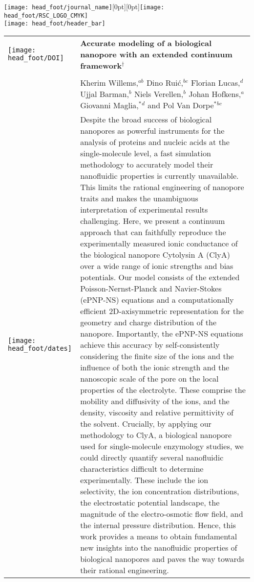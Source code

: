 \documentclass[twoside,twocolumn,9pt]{article}
\begin{document}
  \begin{@twocolumnfalse}
{\texttt{[image: head\_foot/journal\_name]}\hfill\raisebox{0pt}[0pt][0pt]{\texttt{[image: head\_foot/RSC\_LOGO\_CMYK]}}\\[1ex]
\texttt{[image: head\_foot/header\_bar]}}\par
\vspace{1em}
\sffamily
\begin{tabular}{m{4.5cm} p{13.5cm} }

\texttt{[image: head\_foot/DOI]} & \noindent\LARGE{\textbf{%
  Accurate modeling of a biological nanopore with an extended continuum framework$^\dag$
}} \\
\vspace{0.3cm} & \vspace{0.3cm} \\

 & \noindent\large{%
   Kherim Willems,\textit{$^{ab}$}
   Dino Rui\'c,\textit{$^{bc}$}
   Florian Lucas,\textit{$^{d}$}
   Ujjal Barman,\textit{$^{b}$}
   Niels Verellen,\textit{$^{b}$}
   Johan Hofkens,\textit{$^{a}$}
   Giovanni Maglia,$^{\ast}$\textit{$^{d}$} and
   Pol Van Dorpe$^{\ast}$\textit{$^{bc}$}} \\


\texttt{[image: head\_foot/dates]} & \noindent\normalsize{%
%
Despite the broad success of biological nanopores as powerful instruments for the analysis of proteins and
nucleic acids at the single-molecule level, a fast simulation methodology to accurately model their
nanofluidic properties is currently unavailable. This limits the rational engineering of nanopore traits and
makes the unambiguous interpretation of experimental results challenging. Here, we present a continuum
approach that can faithfully reproduce the experimentally measured ionic conductance of the biological
nanopore Cytolysin A (ClyA) over a wide range of ionic strengths and bias potentials. Our model consists of
the extended Poisson-Nernst-Planck and Navier-Stokes (ePNP-NS) equations and a computationally efficient
2D-axisymmetric representation for the geometry and charge distribution of the nanopore. Importantly, the
ePNP-NS equations achieve this accuracy by self-consistently considering the finite size of the ions and the
influence of both the ionic strength and the nanoscopic scale of the pore on the local properties of the
electrolyte. These comprise the mobility and diffusivity of the ions, and the density, viscosity and relative
permittivity of the solvent. Crucially, by applying our methodology to ClyA, a biological nanopore used for
single-molecule enzymology studies, we could directly quantify several nanofluidic characteristics difficult
to determine experimentally. These include the ion selectivity, the ion concentration distributions, the
electrostatic potential landscape, the magnitude of the electro-osmotic flow field, and the internal pressure
distribution. Hence, this work provides a means to obtain fundamental new insights into the nanofluidic
properties of biological nanopores and paves the way towards their rational engineering.
%
} \\


\end{tabular}
\end{@twocolumnfalse}
\end{document}
